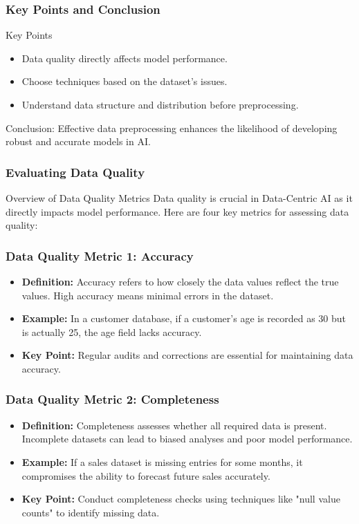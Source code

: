 \documentclass[aspectratio=169]{beamer}
\begin{document}
\begin{frame}[fragile]
    \frametitle{Key Points and Conclusion}
    \begin{block}{Key Points}
        \begin{itemize}
            \item Data quality directly affects model performance.
            \item Choose techniques based on the dataset's issues.
            \item Understand data structure and distribution before preprocessing.
        \end{itemize}
    \end{block}
    
    Conclusion: Effective data preprocessing enhances the likelihood of developing robust and accurate models in AI.
\end{frame}

\begin{frame}[fragile]
    \frametitle{Evaluating Data Quality}
    \begin{block}{Overview of Data Quality Metrics}
        Data quality is crucial in Data-Centric AI as it directly impacts model performance. Here are four key metrics for assessing data quality:
    \end{block}
\end{frame}

\begin{frame}[fragile]
    \frametitle{Data Quality Metric 1: Accuracy}
    \begin{itemize}
        \item \textbf{Definition:} Accuracy refers to how closely the data values reflect the true values. High accuracy means minimal errors in the dataset.
        \item \textbf{Example:} In a customer database, if a customer's age is recorded as 30 but is actually 25, the age field lacks accuracy.
        \item \textbf{Key Point:} Regular audits and corrections are essential for maintaining data accuracy.
    \end{itemize}
\end{frame}

\begin{frame}[fragile]
    \frametitle{Data Quality Metric 2: Completeness}
    \begin{itemize}
        \item \textbf{Definition:} Completeness assesses whether all required data is present. Incomplete datasets can lead to biased analyses and poor model performance.
        \item \textbf{Example:} If a sales dataset is missing entries for some months, it compromises the ability to forecast future sales accurately.
        \item \textbf{Key Point:} Conduct completeness checks using techniques like "null value counts" to identify missing data.
    \end{itemize}
\end{frame}
\end{document}
